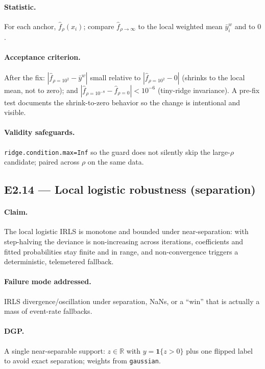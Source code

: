\documentclass[11pt]{article}
\newcommand{\code}[1]{\texttt{#1}}
\begin{document}
\paragraph{Statistic.} For each anchor, $\hat f_\rho(x_i)$; compare $\hat f_{\rho\to\infty}$ to
the local weighted mean $\bar y_i^{w}$ and to $0$.

\paragraph{Acceptance criterion.} After the fix: $|\hat f_{\rho=10^2}-\bar y^{w}|$ small relative
to $|\hat f_{\rho=10^2}-0|$ (shrinks to the local mean, not to zero); and
$|\hat f_{\rho=10^{-8}}-\hat f_{\rho=0}|<10^{-6}$ (tiny-ridge invariance). A pre-fix test
documents the shrink-to-zero behavior so the change is intentional and visible.

\paragraph{Validity safeguards.} \code{ridge.condition.max=Inf} so the guard does not silently
skip the large-$\rho$ candidate; paired across $\rho$ on the same data.

\subsection{E2.14 — Local logistic robustness (separation)}

\paragraph{Claim.} The local logistic IRLS is monotone and bounded under near-separation: with
step-halving the deviance is non-increasing across iterations, coefficients and fitted
probabilities stay finite and in range, and non-convergence triggers a deterministic, telemetered
fallback.

\paragraph{Failure mode addressed.} IRLS divergence/oscillation under separation, NaNs, or a
``win'' that is actually a mass of event-rate fallbacks.

\paragraph{DGP.} A single near-separable support: $z\in\mathbb{R}$ with $y=\mathbf{1}\{z>0\}$ plus
one flipped label to avoid exact separation; weights from \code{gaussian}.
\end{document}

